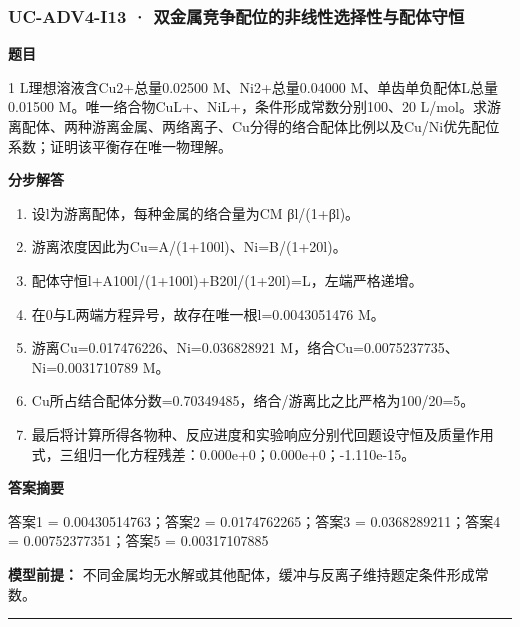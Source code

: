 \documentclass[UTF8,11pt,a4paper]{ctexart}
\begin{document}
\subsubsection*{UC-ADV4-I13 · 双金属竞争配位的非线性选择性与配体守恒}
\noindent\textbf{题目}\par
1 L理想溶液含Cu2+总量0.02500 M、Ni2+总量0.04000 M、单齿单负配体L总量0.01500 M。唯一络合物CuL+、NiL+，条件形成常数分别100、20 L/mol。求游离配体、两种游离金属、两络离子、Cu分得的络合配体比例以及Cu/Ni优先配位系数；证明该平衡存在唯一物理解。\par
\medskip\noindent\textbf{分步解答}
\begin{enumerate}
\item 设l为游离配体，每种金属的络合量为CM βl/(1+βl)。
\item 游离浓度因此为Cu=A/(1+100l)、Ni=B/(1+20l)。
\item 配体守恒l+A100l/(1+100l)+B20l/(1+20l)=L，左端严格递增。
\item 在0与L两端方程异号，故存在唯一根l=0.0043051476 M。
\item 游离Cu=0.017476226、Ni=0.036828921 M，络合Cu=0.0075237735、Ni=0.0031710789 M。
\item Cu所占结合配体分数=0.70349485，络合/游离比之比严格为100/20=5。
\item 最后将计算所得各物种、反应进度和实验响应分别代回题设守恒及质量作用式，三组归一化方程残差：0.000e+0；0.000e+0；-1.110e-15。
\end{enumerate}
\noindent\textbf{答案摘要}\par
答案1 = 0.00430514763；答案2 = 0.0174762265；答案3 = 0.0368289211；答案4 = 0.00752377351；答案5 = 0.00317107885\par
\noindent\textbf{模型前提：}
不同金属均无水解或其他配体，缓冲与反离子维持题定条件形成常数。\par
\medskip\hrule\medskip
{}
\end{document}
